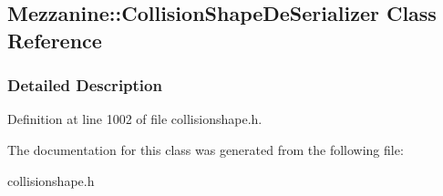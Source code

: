 \hypertarget{classMezzanine_1_1CollisionShapeDeSerializer}{
\subsection{Mezzanine::CollisionShapeDeSerializer Class Reference}
\label{classMezzanine_1_1CollisionShapeDeSerializer}
}


\subsubsection{Detailed Description}


Definition at line 1002 of file collisionshape.h.



The documentation for this class was generated from the following file:\begin{DoxyCompactItemize}
\item 
collisionshape.h\end{DoxyCompactItemize}
